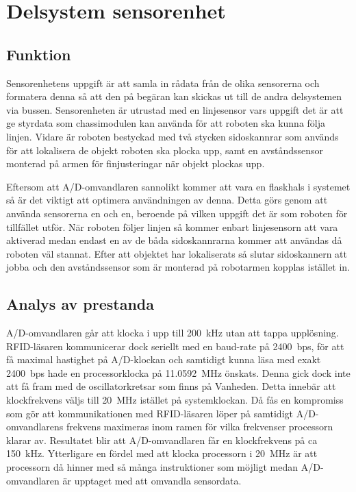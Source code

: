 

\section{Delsystem sensorenhet}


\subsection{Funktion}

Sensorenhetens uppgift är att samla in rådata från de olika sensorerna och formatera denna så att den på begäran kan skickas ut till de andra delsystemen via bussen. Sensorenheten är utrustad med en linjesensor vars uppgift det är att ge styrdata som chassimodulen kan använda för att roboten ska kunna följa linjen. Vidare är roboten bestyckad med två stycken sidoskannrar som används för att lokalisera de objekt roboten ska plocka upp, samt en avståndssensor monterad på armen för finjusteringar när objekt plockas upp.

Eftersom att A/D-omvandlaren sannolikt kommer att vara en flaskhals i systemet så är det viktigt att optimera användningen av denna. Detta görs genom att använda sensorerna en och en, beroende på vilken uppgift det är som roboten för tillfället utför. När roboten följer linjen så kommer enbart linjesensorn att vara aktiverad medan endast en av de båda sidoskannrarna kommer att användas då roboten väl stannat. Efter att objektet har lokaliserats så slutar sidoskannern att jobba och den avståndssensor som är monterad på robotarmen kopplas istället in.


\subsection{Analys av prestanda}

A/D-omvandlaren går att klocka i upp till 200~kHz utan att tappa upplösning. RFID-läsaren kommunicerar dock seriellt med en baud-rate på 2400~bps, för att få maximal hastighet på A/D-klockan och samtidigt kunna läsa med exakt 2400~bps hade en processorklocka på 11.0592~MHz önskats. Denna gick dock inte att få fram med de oscillatorkretsar som finns på Vanheden. Detta innebär att klockfrekvens väljs till  20~MHz istället på systemklockan. Då fås en kompromiss som gör att kommunikationen med RFID-läsaren löper på samtidigt A/D-omvandlarens frekvens maximeras inom ramen för vilka frekvenser processorn klarar av. Resultatet blir att A/D-omvandlaren får en klockfrekvens på ca 150~kHz. Ytterligare en fördel med att klocka processorn i 20~MHz är att processorn då hinner med så många instruktioner som möjligt medan A/D-omvandlaren är upptaget med att omvandla sensordata.

